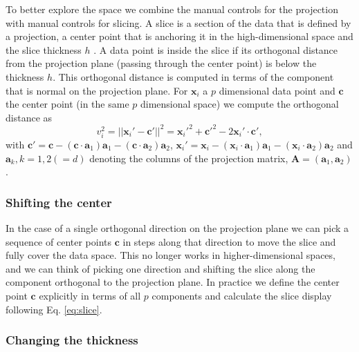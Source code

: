 \documentclass[]{interact}
\theoremstyle{plain}%
\theoremstyle{definition}
\theoremstyle{remark}
\begin{document}
To better explore the space we combine the manual controls for the
projection with manual controls for slicing. A slice is a section of the
data that is defined by a projection, a center point that is anchoring
it in the high-dimensional space and the slice thickness \(h\)
\citep{slicetour}. A data point is inside the slice if its orthogonal
distance from the projection plane (passing through the center point) is
below the thickness \(h\). This orthogonal distance is computed in terms
of the component that is normal on the projection plane. For
\(\mathbf{x}_i\) a \(p\) dimensional data point and \(\mathbf{c}\) the
center point (in the same \(p\) dimensional space) we compute the
orthogonal distance as \begin{equation}
v_i^2 = ||\mathbf{x}_i' - \mathbf{c}'||^2 = \mathbf{x}_i'^2 + \mathbf{c}'^2 - 2 \mathbf{x}_i'\cdot\mathbf{c}' ,
\label{eq:slice}
\end{equation} with
\(\mathbf{c}' = \mathbf{c} - (\mathbf{c}\cdot \mathbf{a}_1) \mathbf{a}_1 - (\mathbf{c}\cdot \mathbf{a}_2 )\mathbf{a}_2\),
\(\mathbf{x}_i' = \mathbf{x}_i - (\mathbf{x}_i\cdot \mathbf{a}_1) \mathbf{a}_1 - (\mathbf{x}_i\cdot \mathbf{a}_2) \mathbf{a}_2\)
and \(\mathbf{a}_k, k=1,2 (=d)\) denoting the columns of the projection
matrix, \(\mathbf{A}=(\mathbf{a}_1, \mathbf{a}_2)\).

\hypertarget{shifting-the-center}{%
\subsubsection{Shifting the center}\label{shifting-the-center}}

In the case of a single orthogonal direction on the projection plane we
can pick a sequence of center points \(\mathbf{c}\) in steps along that
direction to move the slice and fully cover the data space. This no
longer works in higher-dimensional spaces, and we can think of picking
one direction and shifting the slice along the component orthogonal to
the projection plane. In practice we define the center point
\(\mathbf{c}\) explicitly in terms of all \(p\) components and calculate
the slice display following Eq. \ref{eq:slice}.

\hypertarget{changing-the-thickness}{%
\subsubsection{Changing the thickness}\label{changing-the-thickness}}
\end{document}
